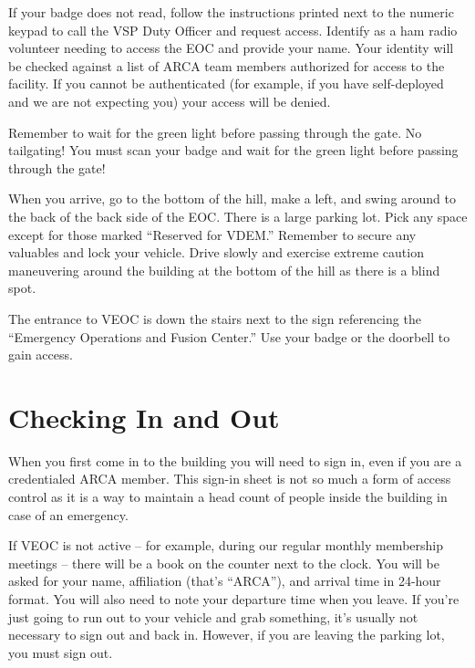 \documentclass[pdflatex,letterpaper,twoside,12pt]{book}
\begin{document}
If your badge does not read, follow the instructions printed next to the numeric keypad to call the VSP Duty Officer and request access.  Identify as a ham radio volunteer needing to access the EOC and provide your name.  Your identity will be checked against a list of ARCA team members authorized for access to the facility.  If you cannot be authenticated (for example, if you have self-deployed and we are not expecting you) your access will be denied.

Remember to wait for the green light before passing through the gate.  No tailgating!  You must scan your badge and wait for the green light before passing through the gate!

When you arrive, go to the bottom of the hill, make a left, and swing around to the back of the back side of the EOC.  There is a large parking lot.  Pick any space except for those marked “Reserved for VDEM.”  Remember to secure any valuables and lock your vehicle.  Drive slowly and exercise extreme caution maneuvering around the building at the bottom of the hill as there is a blind spot.

The entrance to VEOC is down the stairs next to the sign referencing the ``Emergency Operations and Fusion Center.''  Use your badge or the doorbell to gain access.




\section{Checking In and Out}

When you first come in to the building you will need to sign in, even if you are a credentialed ARCA member.  This sign-in sheet is not so much a form of access control as it is a way to maintain a head count of people inside the building in case of an emergency.

If VEOC is not active – for example, during our regular monthly membership meetings – there will be a book on the counter next to the clock.  You will be asked for your name, affiliation (that's “ARCA”), and arrival time in 24-hour format.  You will also need to note your departure time when you leave.  If you're just going to run out to your vehicle and grab something, it's usually not necessary to sign out and back in.  However, if you are leaving the parking lot, you must sign out.
\end{document}
